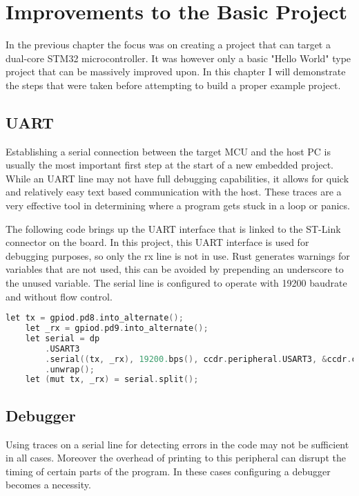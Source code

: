 \chapter{Improvements to the Basic Project}

In the previous chapter the focus was on creating a project that can target a dual-core STM32 microcontroller. It was however only a basic "Hello World" type project that can be massively improved upon. In this chapter I will demonstrate the steps that were taken before attempting to build a proper example project.

\section{UART}

Establishing a serial connection between the target MCU and the host PC is usually the most important first step at the start of a new embedded project. While an UART line may not have full debugging capabilities, it allows for quick and relatively easy text based communication with the host. These traces are a very effective tool in determining where a program gets stuck in a loop or panics.

The following code brings up the UART interface that is linked to the ST-Link connector on the board. In this project, this UART interface is used for debugging purposes, so only the rx line is not in use. Rust generates warnings for variables that are not used, this can be avoided by prepending an underscore to the unused variable. The serial line is configured to operate with 19200 baudrate and without flow control.

\begin{lstlisting}[language=C,frame=single,float=!ht,label={lst:uart-bringup},caption={UART Interface Configuration}]
    let tx = gpiod.pd8.into_alternate();
    let _rx = gpiod.pd9.into_alternate();
    let serial = dp
        .USART3
        .serial((tx, _rx), 19200.bps(), ccdr.peripheral.USART3, &ccdr.clocks)
        .unwrap();
    let (mut tx, _rx) = serial.split();
\end{lstlisting}

\section{Debugger}

Using traces on a serial line for detecting errors in the code may not be sufficient in all cases. Moreover the overhead of printing to this peripheral can disrupt the timing of certain parts of the program. In these cases configuring a debugger becomes a necessity.

